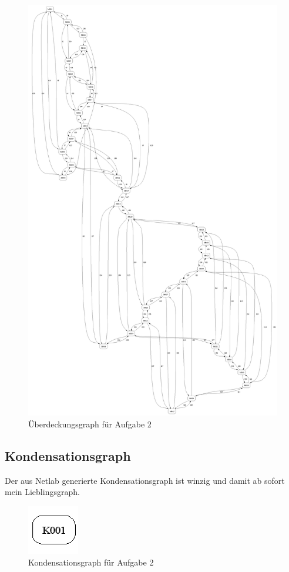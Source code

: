 \documentclass[10pt]{scrartcl}
\begin{document}
\begin{figure}[htbp]
	\centering	\includegraphics[height=1.0\textheight]{Bilder/Aufgabe2_UG.png}
	\caption{Überdeckungsgraph für Aufgabe 2}
	\label{fig:UG2}
\end{figure}

\subsection{Kondensationsgraph}
Der aus Netlab generierte Kondensationsgraph ist winzig und damit ab sofort mein Lieblingsgraph.

\begin{figure}[htbp]
	\centering	\includegraphics[width=0.2\textwidth]{Bilder/Aufgabe2_KG.png}
	\caption{Kondensationsgraph für Aufgabe 2}
	\label{fig:KG1}
\end{figure}
\end{document}
